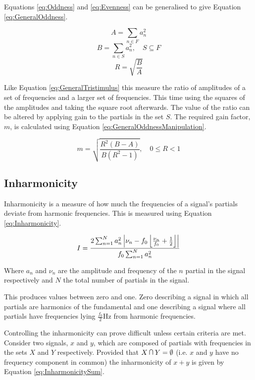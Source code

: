 		Equations \ref{eq:Oddness} and \ref{eq:Evenness} can be generalised to give Equation
		\ref{eq:GeneralOddness}.

		\[ A = \sum_{n \in F} a_{n}^{2} \]
		\[ B = \sum_{n \in S} a_{n}^{2}, \quad S \subseteq F \]
		\begin{equation}
			R = \sqrt{\frac{B}{A}}
			\label{eq:GeneralOddness}
		\end{equation}

		Like Equation \ref{eq:GeneralTristimulus} this measure the ratio of amplitudes of a set of frequencies and
		a larger set of frequencies. This time using the squares of the amplitudes and taking the square root
		afterwards. The value of the ratio can be altered by applying gain to the partials in the set $S$. The
		required gain factor, $m$, is calculated using Equation \ref{eq:GeneralOddnessManipulation}.

		\begin{equation}
			m = \sqrt{\frac{R^{2}(B - A)}{B(R^{2} - 1)}}, \quad 0 \leq R < 1
			\label{eq:GeneralOddnessManipulation}
		\end{equation}

	\subsection{Inharmonicity}
	\label{sec:FetureControl-Parameterisation-Inharmonicity}
		Inharmonicity is a measure of how much the frequencies of a signal's partials deviate from harmonic
		frequencies. This is measured using Equation \ref{eq:Inharmonicity}.
		
		\begin{equation}
			I = \frac{2\sum_{n = 1}^{N}a_{n}^{2}
			           \left|\nu_{n} - f_{0}\left\lfloor\frac{\nu_{n}}{f_{0}} + \frac{1}{2}\right\rfloor\right|}
				   {f_{0}\sum_{n = 1}^{N} a_{n}^{2}}
			\label{eq:Inharmonicity}
		\end{equation}

		Where $a_{n}$ and $\nu_{n}$ are the amplitude and frequency of the $n$ partial in the signal
		respectively and $N$ the total number of partials in the signal.

		This produces values between zero and one. Zero describing a signal in which all partials are harmonics of
		the fundamental and one describing a signal where all partials have frequencies lying
		$\frac{f_{0}}{2}$Hz from harmonic frequencies.

		Controlling the inharmonicity can prove difficult unless certain criteria are met. Consider two signals, $x$
		and $y$, which are composed of partials with frequencies in the sets $X$ and $Y$ respectively. Provided that
		$X \medcap Y = \emptyset$ (i.e. $x$ and $y$ have no frequency component in common) the inharmonicity of $x +
		y$ is given by Equation \ref{eq:InharmonicitySum}.

